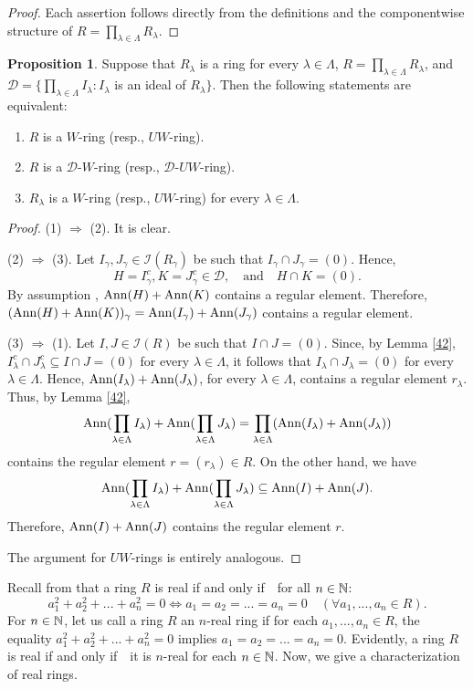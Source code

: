 \documentclass{amsart}
\theoremstyle{definition}
\theoremstyle{remark}
\numberwithin{equation}{section}
\newcommand{\CD}{\mathcal{D}}
\newcommand{\CI}{\mathcal{I}}
\newcommand{\Ann}{{\rm Ann}}
\newcommand{\sub}{\supseteq}
\newcommand{\la}{\lambda}
\newcommand{\La}{\Lambda}
\newcommand{\ga}{\gamma}
\newcommand{\RTA}{\Rightarrow}
\def\ifif {if and only if\ \ }
\def\sub {\subseteq}
\def\RTA {\Rightarrow }
\theoremstyle{definition}\newtheorem{thm}{Theorem}[section]
\theoremstyle{definition}\newtheorem{cor}[thm]{Corollary}
\theoremstyle{definition}\newtheorem{lem}[thm]{Lemma}
\theoremstyle{definition}\newtheorem{prop}[thm]{Proposition}
\theoremstyle{definition}\newtheorem{defn}[thm]{Definition}
\theoremstyle{definition}\newtheorem{Rem}[thm]{Remark}
\theoremstyle{remark}\newtheorem{rem}[thm]{Remark}
\theoremstyle{definition}\newtheorem{exam}[thm]{Example}
\theoremstyle{definition}\newtheorem{qu}[thm]{question}
\begin{document}
\begin{proof}
Each assertion follows directly from the definitions and the componentwise structure of $R=\prod_{\lambda\in\Lambda}R_\lambda$.
\end{proof}
\begin{prop} Suppose that $R_\la$ is a ring for every $\la\in\La$, $R=\prod_{\la\in\La}R_\la$, and $\CD=\{\prod_{\la\in\La}I_\la: I_\la$ is an ideal of $R_\la\}$. Then the following statements are equivalent: 
\begin{enumerate}
\item $R$ is a $W$-ring (resp., $UW$-ring). 

\item $R$ is a $\CD$-$W$-ring (resp., $\CD$-$UW$-ring). 

\item $R_\la$ is a $W$-ring (resp., $UW$-ring) for every $\la\in\La$. 
\end{enumerate}
\end{prop} 
\begin{proof} (1) $\RTA$ (2). It is clear. 

(2) $\RTA$ (3). Let $I_\ga, J_\ga\in\CI(R_\ga)$ be such that $I_\ga\cap J_\ga=(0)$. Hence, \[H=I_\ga^{c}, K=J_\ga^{c}\in\CD,\quad \text{and}\quad H\cap K=(0).\] By assumption , $\Ann(H)+\Ann(K)$ contains a regular element. Therefore, $(\Ann(H)+\Ann(K))_\ga=\Ann(I_\ga)+\Ann(J_\ga)$ contains a regular element. 

(3) $\RTA$ (1). Let $I, J\in\CI(R)$ be such that $I\cap J=(0)$. Since, by Lemma \ref{42}, $I_{\la}^{c}\cap J_\la^{c}\sub I\cap J=(0)$ for every $\la\in\La$, it follows that $I_\la\cap J_\la=(0)$ for every $\la\in\La$. Hence, $\Ann(I_\la)+\Ann(J_\la)$, for every $\la\in\La$, contains a regular element $r_\la$. Thus, by Lemma \ref{42}, \[\Ann(\prod_{\la\in\La}I_\la)+\Ann(\prod_{\la\in\La}J_\la)=\prod_{\la\in\La}(\Ann(I_\la)+\Ann(J_\la))\] contains the regular element $r=(r_\la)\in R$. On the other hand, we have \[\Ann(\prod_{\la\in\La}I_\la)+\Ann(\prod_{\la\in\La}J_\la)\sub\Ann(I)+\Ann(J).\] Therefore, $\Ann(I)+\Ann(J)$ contains the regular element $r$.

The argument for $UW$-rings is entirely analogous.
\end{proof}
Recall from \cite{C} that a ring $R$ is real \ifif  for all $n\in\Bbb N$: \[a_1^2+ a_2^2+...+ a_n^2=0 \Leftrightarrow a_1=a_2=...=a_n=0 \quad(\forall a_1, ..., a_n\in R).\] 
For $n\in\Bbb N$, let us call a ring $R$ an $n$-real ring if for each $a_1, ..., a_n\in R$, the equality $a_1^2+ a_2^2+...+ a_n^2=0$ implies $a_1=a_2=...= a_n=0$. Evidently, a ring $R$ is real \ifif it is $n$-real for each $n\in\Bbb N$. Now, we give a characterization of real rings.
\end{document}
